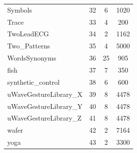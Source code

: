 \documentclass[natbib,smallextended]{svjour3}
\begin{document}
\begin{table} [h!]
\begin{center}
\begin{tabular}{lccc}
Symbols & 32 &  6 & 1020 \\
Trace & 33 &  4 &  200 \\
TwoLeadECG & 34 &  2 & 1162 \\
Two\_Patterns & 35 &  4 & 5000 \\
WordsSynonyms & 36 & 25 &  905 \\
fish & 37 &  7 &  350 \\
synthetic\_control & 38 &  6 &  600 \\
uWaveGestureLibrary\_X & 39 &  8 & 4478 \\
uWaveGestureLibrary\_Y & 40 &  8 & 4478 \\
uWaveGestureLibrary\_Z & 41 &  8 & 4478 \\
wafer & 42 &  2 & 7164 \\
yoga & 43 &  2 & 3300 \\
\end{tabular}
\end{center}
\end{table}
\end{document}
